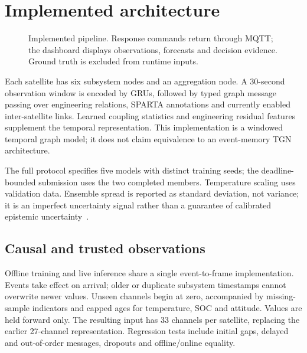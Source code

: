 \documentclass[10pt,a4paper,twocolumn]{article}
\begin{document}
\section{Implemented architecture}
\begin{figure}[ht]
\centering
{}
\caption{Implemented pipeline. Response commands return through MQTT; the dashboard displays observations, forecasts and decision evidence. Ground truth is excluded from runtime inputs.}
\end{figure}

Each satellite has six subsystem nodes and an aggregation node. A 30-second observation window is encoded by GRUs, followed by typed graph message passing over engineering relations, SPARTA annotations and currently enabled inter-satellite links. Learned coupling statistics and engineering residual features supplement the temporal representation. This implementation is a windowed temporal graph model; it does not claim equivalence to an event-memory TGN architecture.

The full protocol specifies five models with distinct training seeds; the deadline-bounded submission uses the two completed members. Temperature scaling uses validation data. Ensemble spread is reported as standard deviation, not variance; it is an imperfect uncertainty signal rather than a guarantee of calibrated epistemic uncertainty~\cite{ensemble,calibration}.

\subsection{Causal and trusted observations}
Offline training and live inference share a single event-to-frame implementation. Events take effect on arrival; older or duplicate subsystem timestamps cannot overwrite newer values. Unseen channels begin at zero, accompanied by missing-sample indicators and capped ages for temperature, SOC and attitude. Values are held forward only. The resulting input has 33 channels per satellite, replacing the earlier 27-channel representation. Regression tests include initial gaps, delayed and out-of-order messages, dropouts and offline/online equality.
\end{document}
